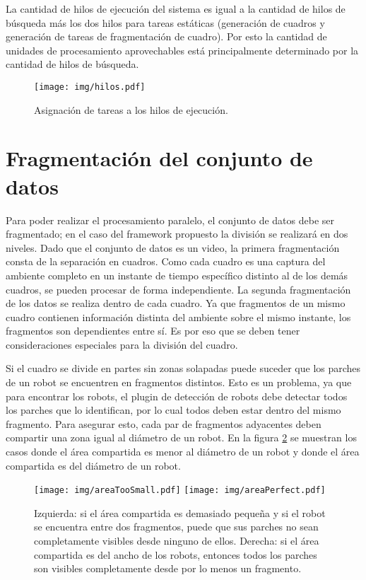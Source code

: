 La cantidad de hilos de ejecución del sistema es igual a la cantidad de hilos de
búsqueda más los dos hilos para tareas estáticas (generación de cuadros y
generación de tareas de fragmentación de cuadro). Por esto la cantidad de
unidades de procesamiento aprovechables está principalmente determinado por la
cantidad de hilos de búsqueda.

\begin{figure}[!htb]

	\texttt{[image: img/hilos.pdf]}

	\caption{Asignación de tareas a los hilos de ejecución.}

	\label{hilosFramework}

\end{figure}

\section{Fragmentación del conjunto de datos}

Para poder realizar el procesamiento paralelo, el conjunto de datos debe ser
fragmentado; en el caso del framework propuesto la división se realizará en
dos niveles. Dado que el conjunto de datos es un video, la primera
fragmentación consta de la separación en cuadros. Como cada cuadro es una
captura del ambiente completo en un instante de tiempo específico distinto al de
los demás cuadros, se pueden procesar de forma independiente. La segunda
fragmentación de los datos se realiza dentro de cada cuadro. Ya que fragmentos
de un mismo cuadro contienen información distinta del ambiente sobre el mismo
instante, los fragmentos son dependientes entre sí. Es por eso que se deben
tener consideraciones especiales para la división del cuadro.

Si el cuadro se divide en partes sin zonas solapadas puede suceder que los
parches de un robot se encuentren en fragmentos distintos. Esto es un problema,
ya que para encontrar los robots, el plugin de detección de robots debe detectar
todos los parches que lo identifican, por lo cual todos deben estar dentro del
mismo fragmento. Para asegurar esto, cada par de fragmentos adyacentes deben
compartir una zona igual al diámetro de un robot. En la figura
\ref{areaCompartida} se muestran los casos donde el área compartida es menor al
diámetro de un robot y donde el área compartida es del diámetro de un robot.

\begin{figure}[!htb]

	\centering
	\texttt{[image: img/areaTooSmall.pdf]}
	\texttt{[image: img/areaPerfect.pdf]}

	\caption{Izquierda: si el área compartida es demasiado pequeña y si el
	robot se encuentra entre dos fragmentos, puede que sus parches no sean
	completamente visibles desde ninguno de ellos. Derecha: si el área
	compartida es del ancho de los robots, entonces todos los parches son
	visibles completamente desde por lo menos un fragmento.}

	\label{areaCompartida}

\end{figure}

